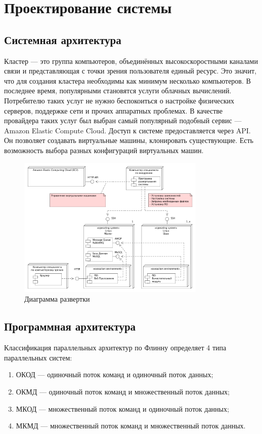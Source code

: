 \chapter{Проектирование системы}

\section{Системная архитектура}

Кластер — это группа компьютеров, объединённых высокоскоростными каналами связи и представляющая с точки зрения пользователя единый ресурс. Это значит, что для создания кластера необходимы как минимум несколько компьютеров. В последнее время, популярными становятся услуги облачных вычислений. Потребителю таких услуг не нужно беспокоиться о настройке физических серверов, поддержке сети и прочих аппаратных проблемах. В качестве провайдера таких услуг был выбран самый популярный подобный сервис — Amazon Elastic Compute Cloud. Доступ к системе предоставляется через API. Он позволяет создавать виртуальные машины, клонировать существующие. Есть возможность выбора разных конфигураций виртуальных машин.


\begin{figure}
  \centering
  \includegraphics[width=0.8\textwidth]{assets/deploy-1.png}
  \caption{Диаграмма развертки}
  \label{fig:fig01}
\end{figure}


\section{Программная архитектура}

Классификация параллельных архитектур по Флинну определяет 4 типа параллельных систем:
\begin{enumerate}
  \item ОКОД — одиночный поток команд и одиночный поток данных;
  \item ОКМД — одиночный поток команд и множественный поток данных;
  \item МКОД — множественный поток команд и одиночный поток данных;
  \item МКМД — множественный поток команд и множественный поток данных.
\end{enumerate}

